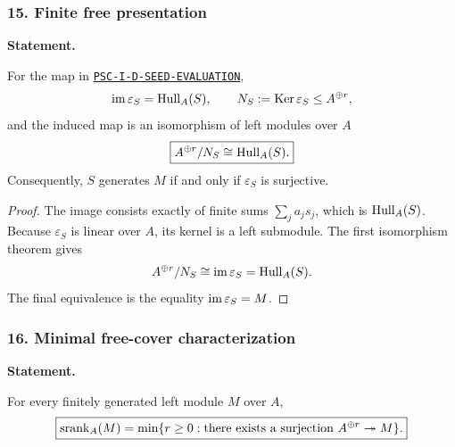 \subsubsection*{15. Finite free presentation}
\label{rec:PSC-I-T-FREE-PRESENTATION}
\textbf{Statement.}\par
For the map in \hyperref[rec:PSC-I-D-SEED-EVALUATION]{\nolinkurl{PSC-I-D-SEED-EVALUATION}},
\[
\operatorname{im}\varepsilon_S=\operatorname{Hull}_A(S),
\qquad
N_S:=\operatorname{Ker}\varepsilon_S\leq A^{\oplus r},
\]
and the induced map is an isomorphism of left modules over $A$
\[
\boxed{A^{\oplus r}/N_S\cong\operatorname{Hull}_A(S).}
\]
Consequently, $S$ generates $M$ if and only if $\varepsilon_S$ is surjective.

\begin{proof}
The image consists exactly of finite sums $\sum_ja_js_j$, which is $\operatorname{Hull}_A(S)$.  Because $\varepsilon_S$ is linear over $A$, its kernel is a left submodule.  The first isomorphism theorem gives
\[
A^{\oplus r}/N_S\cong\operatorname{im}\varepsilon_S=\operatorname{Hull}_A(S).
\]
The final equivalence is the equality $\operatorname{im}\varepsilon_S=M$.
\end{proof}
\subsubsection*{16. Minimal free-cover characterization}
\label{rec:PSC-I-C-MINIMAL-FREE-COVER}
\textbf{Statement.}\par
For every finitely generated left module $M$ over $A$,
\[
\boxed{
\operatorname{srank}_A(M)=\min\{r\geq0:\text{there exists a surjection }A^{\oplus r}\twoheadrightarrow M\}.
}
\]

